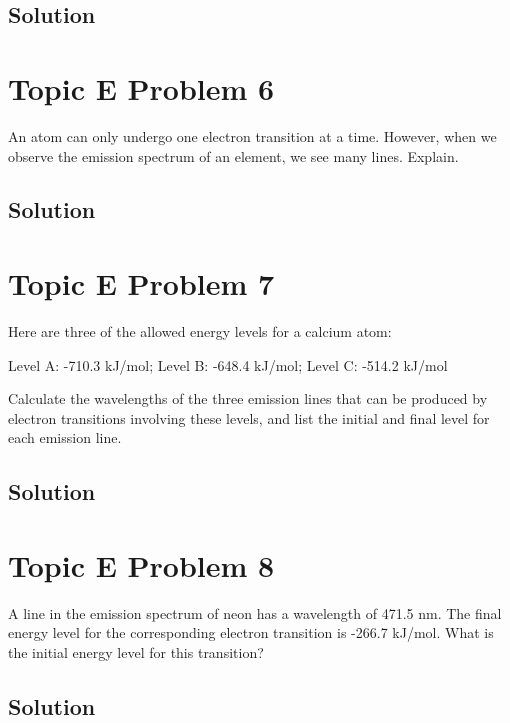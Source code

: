 \documentclass[10pt]{article}
\begin{document}
        \subsection{Solution}


    \pagebreak
    \section{Topic E Problem 6}
        An atom can only undergo one electron transition at a time. 
        However, when we observe the emission spectrum of an element, we see many lines. 
        Explain.

        \subsection{Solution}


    \pagebreak
    \section{Topic E Problem 7}
        Here are three of the allowed energy levels for a calcium atom:
        \begin{center}
            Level A: -710.3 kJ/mol; Level B: -648.4 kJ/mol; Level C: -514.2 kJ/mol
        \end{center}
        Calculate the wavelengths of the three emission lines that can be produced by electron transitions involving these levels, and list the initial and final level for each emission line.

        \subsection{Solution}


    \pagebreak
    \section{Topic E Problem 8}
        A line in the emission spectrum of neon has a wavelength of 471.5 nm. 
        The final energy level for the corresponding electron transition is -266.7 kJ/mol. 
        What is the initial energy level for this transition?

        \subsection{Solution}


    \pagebreak
\end{document}
